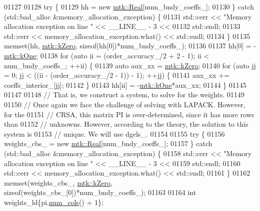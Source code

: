 \begin{DoxyCode}
{{01127 
01128   \textcolor{keywordflow}{try} \{
01129     hh = \textcolor{keyword}{new} \hyperlink{group__c01-roots_gac080bbbf5cbb5502c9f00405f894857d}{mtk::Real}[num\_bndy\_coeffs\_];
01130   \} \textcolor{keywordflow}{catch} (std::bad\_alloc &memory\_allocation\_exception) \{
01131     std::cerr << \textcolor{stringliteral}{"Memory allocation exception on line "} << \_\_LINE\_\_ - 3 <<
01132       std::endl;
01133     std::cerr << memory\_allocation\_exception.what() << std::endl;
01134   \}
01135   memset(hh, \hyperlink{group__c01-roots_ga59a451a5fae30d59649bcda274fea271}{mtk::kZero}, \textcolor{keyword}{sizeof}(hh[0])*num\_bndy\_coeffs\_);
01136 
01137   hh[0] = -\hyperlink{group__c01-roots_ga26407c24d43b6b95480943340d285c71}{mtk::kOne};
01138   \textcolor{keywordflow}{for} (\textcolor{keyword}{auto} ii = (order\_accuracy\_/2 + 2 - 1); ii < num\_bndy\_coeffs\_; ++ii) \{
01139     \textcolor{keyword}{auto} aux\_xx = \hyperlink{group__c01-roots_ga59a451a5fae30d59649bcda274fea271}{mtk::kZero};
01140     \textcolor{keywordflow}{for} (\textcolor{keyword}{auto} jj = 0; jj < ((ii - (order\_accuracy\_/2 - 1)) - 1); ++jj) \{
01141       aux\_xx += coeffs\_interior\_[jj];
01142     \}
01143     hh[ii] = -\hyperlink{group__c01-roots_ga26407c24d43b6b95480943340d285c71}{mtk::kOne}*aux\_xx;
01144   \}
01145 
01147 
01148   \textcolor{comment}{// That is, we construct a system, to solve for the weights.}
01149 
01150   \textcolor{comment}{// Once again we face the challenge of solving with LAPACK. However, for the}
01151   \textcolor{comment}{// CRSA, this matrix PI is over-determined, since it has more rows than}
01152   \textcolor{comment}{// unknowns. However, according to the theory, the solution to this system is}
01153   \textcolor{comment}{// unique. We will use dgels\_.}
01154 
01155   \textcolor{keywordflow}{try} \{
01156     weights\_cbs\_ = \textcolor{keyword}{new} \hyperlink{group__c01-roots_gac080bbbf5cbb5502c9f00405f894857d}{mtk::Real}[num\_bndy\_coeffs\_];
01157   \} \textcolor{keywordflow}{catch} (std::bad\_alloc &memory\_allocation\_exception) \{
01158     std::cerr << \textcolor{stringliteral}{"Memory allocation exception on line "} << \_\_LINE\_\_ - 3 <<
01159       std::endl;
01160     std::cerr << memory\_allocation\_exception.what() << std::endl;
01161   \}
01162   memset(weights\_cbs\_, \hyperlink{group__c01-roots_ga59a451a5fae30d59649bcda274fea271}{mtk::kZero}, \textcolor{keyword}{sizeof}(weights\_cbs\_[0])*num\_bndy\_coeffs\_);
01163 
01164   \textcolor{keywordtype}{int} weights\_ld\{pi.\hyperlink{classmtk_1_1DenseMatrix_af6f78373aaf2136f0c78974d7c8de0a8}{num\_cols}() + 1\};
}}
\end{DoxyCode}

